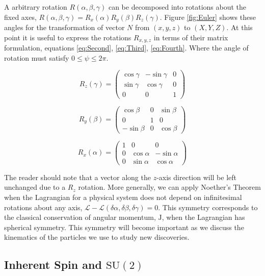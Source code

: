 A arbitrary rotation $R(\alpha, \beta, \gamma)$ can be decomposed into rotations about the fixed axes, $R(\alpha, \beta, \gamma) = R_{x}(\alpha)R_{y}(\beta)R_{z}(\gamma)$. Figure \ref{fig:Euler} shows these angles for the transformation of vector $N$ from $(x,y,z)$ to $(X,Y,Z)$. At this point it is useful to express the rotations $R_{x,y,z}$ in terms of their matrix formulation, equations \eqref{eq:Second}, \eqref{eq:Third}, \eqref{eq:Fourth}. Where the angle of rotation must satisfy $0 \leq \psi \leq 2\pi$.

\begin{equation}
\label{eq:Second}
R_{z}(\gamma) = \left( \begin{array}{ccc}
\cos\gamma & -\sin\gamma & 0 \\
\sin\gamma & \cos\gamma & 0 \\
0 & 0 & 1 \end{array} \right)
\end{equation}

\begin{equation}
\label{eq:Third}
R_{y}(\beta) = \left( \begin{array}{ccc}
\cos\beta & 0 & \sin\beta \\
0 & 1 & 0 \\
-\sin\beta & 0 & \cos\beta \end{array} \right)
\end{equation}

\begin{equation}
\label{eq:Fourth}
R_{x}(\alpha) = \left( \begin{array}{ccc}
1 & 0 & 0 \\
0 & \cos\alpha & -\sin\alpha \\
0 & \sin\alpha & \cos\alpha \end{array} \right) 
\end{equation}

The reader should note that a vector along the $z$-axis direction will be left unchanged due to a $R_{z}$ rotation. More generally, we can apply Noether's Theorem when the Lagrangian for a physical system does not depend on infinitesimal rotations about any axis, $\mathscr{L}-\mathscr{L}(\delta\alpha,\delta\beta,\delta\gamma) = 0$. This symmetry corresponds to the classical conservation of angular momentum, $\mathrm{J}$, when the Lagrangian has spherical symmetry. This symmetry will become important as we discuss the kinematics of the particles we use to study new discoveries.

\subsection{Inherent Spin and \texorpdfstring{$\mathrm{SU}(2)$}{SU(2)}}
\label{sec:SU2}

